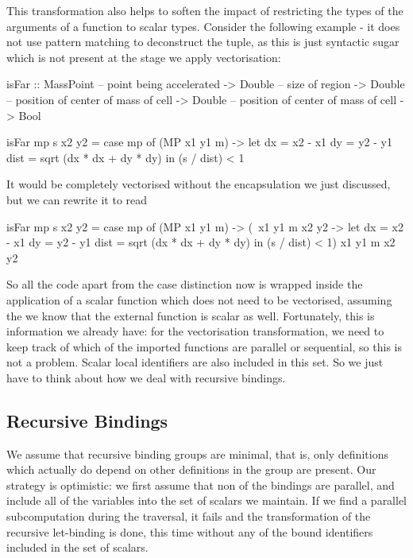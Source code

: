 This transformation also helps to soften the impact of restricting the types of the arguments of a 
function to scalar types. Consider the following example - it does not use pattern matching to deconstruct the tuple, as this is just syntactic sugar which is not present at the stage we apply
vectorisation:
\begin{code}
isFar   :: MassPoint    -- point being accelerated
        -> Double       -- size of region
        -> Double       -- position of center of mass of cell
        -> Double       -- position of center of mass of cell
        -> Bool

isFar mp s x2 y2 = 
  case mp of
      (MP x1 y1 m) ->    
        let  dx      = x2 - x1
             dy      = y2 - y1
             dist    = sqrt (dx * dx + dy * dy)
        in   (s / dist) < 1
\end{code}
 It would be completely vectorised without the encapsulation we just discussed, but we can rewrite it
 to read
\begin{code}
isFar mp s x2 y2 = 
  case mp of
      (MP x1 y1 m) -> (\ x1 y1 m x2 y2 ->   
        let  dx      = x2 - x1
             dy      = y2 - y1
             dist    = sqrt (dx * dx + dy * dy)
        in   (s / dist) < 1) x1 y1 m x2 y2
\end{code}
So all the code apart from the case distinction now is wrapped inside the application of a scalar function which does not need to be vectorised, assuming the we know that the external function 
\icode@sqrt@ is scalar as well. Fortunately, this is information we already  have: for the vectorisation transformation, we need to keep track of which of the imported functions are parallel
or sequential, so this is not a problem. Scalar local identifiers are also included in this set. So
we just have to think about how we deal with recursive bindings. 


\subsection{Recursive Bindings}
We assume that recursive binding groups are minimal, that is, only definitions which actually do
depend on other definitions in the group are present. Our strategy is optimistic: we first assume
that non of the bindings are parallel, and include all of the variables into the set of scalars
we maintain. If we find a parallel subcomputation during the traversal, it fails and the transformation of the recursive let-binding is done, this time without any of the bound identifiers
included in the set of scalars.



